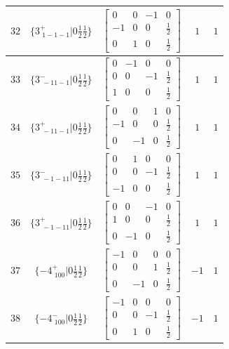\documentclass[fleqn,8pt]{jsarticle}
\begin{document}
\begin{longtable}{ccccc}
$ 32 $ & $ \{3^{+}_{\,\,1-1-1}|0 \frac{1}{2} \frac{1}{2}\} $ & $ \begin{bmatrix} 0 & 0 & -1 & 0 \\ -1 & 0 & 0 & \frac{1}{2} \\ 0 & 1 & 0 & \frac{1}{2} \end{bmatrix} $ & $ 1 $ & $ 1 $ \\ \hline
$ 33 $ & $ \{3^{-}_{\,\,-11-1}|0 \frac{1}{2} \frac{1}{2}\} $ & $ \begin{bmatrix} 0 & -1 & 0 & 0 \\ 0 & 0 & -1 & \frac{1}{2} \\ 1 & 0 & 0 & \frac{1}{2} \end{bmatrix} $ & $ 1 $ & $ 1 $ \\ \hline
$ 34 $ & $ \{3^{+}_{\,\,-11-1}|0 \frac{1}{2} \frac{1}{2}\} $ & $ \begin{bmatrix} 0 & 0 & 1 & 0 \\ -1 & 0 & 0 & \frac{1}{2} \\ 0 & -1 & 0 & \frac{1}{2} \end{bmatrix} $ & $ 1 $ & $ 1 $ \\ \hline
$ 35 $ & $ \{3^{-}_{\,\,-1-11}|0 \frac{1}{2} \frac{1}{2}\} $ & $ \begin{bmatrix} 0 & 1 & 0 & 0 \\ 0 & 0 & -1 & \frac{1}{2} \\ -1 & 0 & 0 & \frac{1}{2} \end{bmatrix} $ & $ 1 $ & $ 1 $ \\ \hline
$ 36 $ & $ \{3^{+}_{\,\,-1-11}|0 \frac{1}{2} \frac{1}{2}\} $ & $ \begin{bmatrix} 0 & 0 & -1 & 0 \\ 1 & 0 & 0 & \frac{1}{2} \\ 0 & -1 & 0 & \frac{1}{2} \end{bmatrix} $ & $ 1 $ & $ 1 $ \\ \hline
$ 37 $ & $ \{-4^{+}_{\,\,100}|0 \frac{1}{2} \frac{1}{2}\} $ & $ \begin{bmatrix} -1 & 0 & 0 & 0 \\ 0 & 0 & 1 & \frac{1}{2} \\ 0 & -1 & 0 & \frac{1}{2} \end{bmatrix} $ & $ -1 $ & $ 1 $ \\ \hline
$ 38 $ & $ \{-4^{-}_{\,\,100}|0 \frac{1}{2} \frac{1}{2}\} $ & $ \begin{bmatrix} -1 & 0 & 0 & 0 \\ 0 & 0 & -1 & \frac{1}{2} \\ 0 & 1 & 0 & \frac{1}{2} \end{bmatrix} $ & $ -1 $ & $ 1 $ \\ \hline

\end{longtable}
\end{document}

